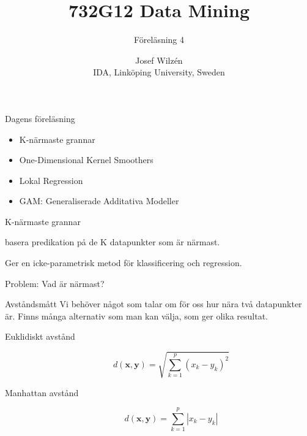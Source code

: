 \documentclass[10pt,english]{beamer}
\title{732G12 Data Mining}
\subtitle{Föreläsning 4}
\date{}
\author{Josef Wilzén \\ IDA, Linköping University, Sweden}
\begin{document}
\maketitle

\begin{frame}{Dagens föreläsning}

    \begin{itemize}
        \item K-närmaste grannar
        \item One-Dimensional Kernel Smoothers
        \item Lokal Regression
        \item GAM: Generaliserade Additativa Modeller
    \end{itemize}
    
\end{frame}

\begin{frame}{K-närmaste grannar}
    \begin{greenbox}
         basera predikation på de K datapunkter som är närmast.
   \end{greenbox}

   Ger en icke-parametrisk metod för klassificering och regression.

   Problem: Vad är närmast?
\end{frame}

\begin{frame}{Avståndsmått}
    Vi behöver något som talar om för oss hur nära två datapunkter är. Finns många alternativ som man kan välja, som ger olika resultat.

    \begin{description}
        \item[Euklidiskt avstånd]
        \begin{equation*}
            d(\mathbf{x},\mathbf{y}) = \sqrt{\sum_{k=1}^{p} (x_k - y_k)^2}
        \end{equation*}
        \item[Manhattan avstånd] 
        \begin{equation*}
            d(\mathbf{x},\mathbf{y}) = \sum_{k=1}^{p} | x_k - y_k |
        \end{equation*}
    \end{description}
\end{frame}
\end{document}
